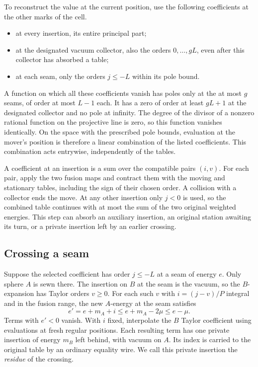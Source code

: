 To reconstruct the value at the current position, use the following
coefficients at the other marks of the cell.
\begin{itemize}
\item at every insertion, its entire principal part;
\item at the designated vacuum collector, also the orders $0,\ldots,gL$,
even after this collector has absorbed a table;
\item at each seam, only the orders $j\le -L$ within its pole bound.
\end{itemize}
A function on which all these coefficients vanish has poles only at the
at most $g$ seams, of order at most $L-1$ each. It has a zero of order
at least $gL+1$ at the designated collector and no pole at infinity.
The degree of the divisor of a nonzero rational function on the projective
line is zero, so this function vanishes identically. On the space with
the prescribed pole bounds, evaluation at the mover's position is
therefore a linear combination of the listed coefficients. This
combination acts entrywise, independently of the tables.

A coefficient at an insertion is a sum over the compatible pairs
$(i,v)$. For each pair, apply the two fusion maps and contract them
with the moving and stationary tables, including the sign of their
chosen order. A collision with a collector ends the move. At any
other insertion only $j<0$ is used, so the combined table continues
with at most the sum of the two original weighted energies. This step
can absorb an auxiliary insertion, an original station awaiting its
turn, or a private insertion left by an earlier crossing.

\subsection{Crossing a seam}

Suppose the selected coefficient has order $j\le-L$ at a seam of
energy $e$. Only sphere $A$ is sewn there. The insertion on $B$ at the
seam is the vacuum, so the $B$-expansion has Taylor orders $v\ge0$.
For each such $v$ with $i=(j-v)/P$ integral and in the fusion range,
the new $A$-energy at the seam satisfies
\begin{equation}
       e'=e+m_A+i\le e+m_A-2\mu\le e-\mu .             \label{eq:motion-drop}
\end{equation}
Terms with $e'<0$ vanish. With $i$ fixed, interpolate the $B$ Taylor
coefficient using evaluations at fresh regular positions. Each resulting
term has one private insertion of energy $m_B$ left behind, with
vacuum on $A$. Its index is carried to the original table by an ordinary
equality wire. We call this private insertion the \emph{residue} of the
crossing.

